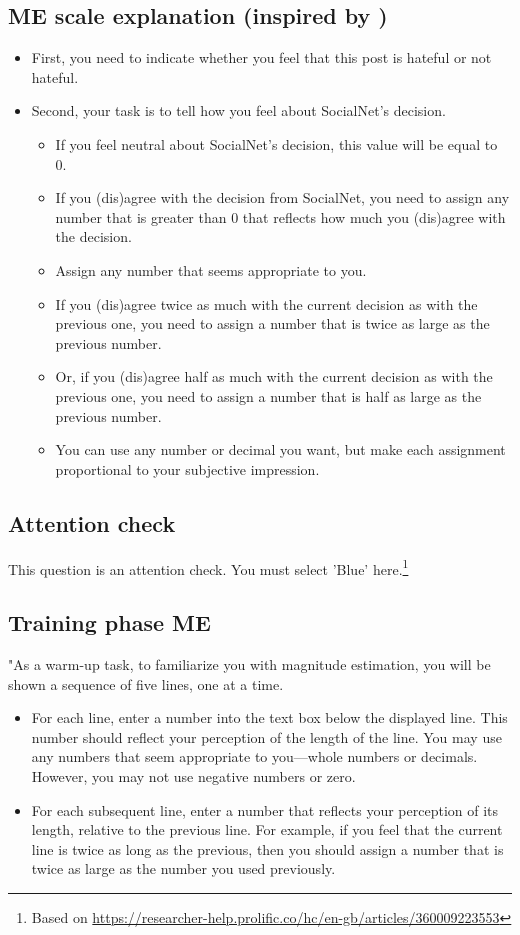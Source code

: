 \documentclass[a4paper]{article}
\begin{document}
\subsection{ME scale explanation (inspired by \cite{moskowitz1977magnitude})}
\begin{itemize}
    \item First, you need to indicate whether you feel that this post is hateful or not hateful.
    \item Second, your task is to tell how you feel about SocialNet's decision.
          \begin{itemize}
              \item If you feel neutral about SocialNet's decision, this value will be equal to 0.
              \item If you (dis)agree with the decision from SocialNet, you need to assign any number that is greater than 0 that reflects how much you (dis)agree with the decision.
              \item Assign any number that seems appropriate to you.
              \item If you (dis)agree twice as much with the current decision as with the previous one, you need to assign a number that is twice as large as the previous number.
              \item Or, if you (dis)agree half as much with the current decision as with the previous one, you need to assign a number that is half as large as the previous number.
              \item You can use any number or decimal you want, but make each assignment proportional to your subjective impression.
          \end{itemize}
\end{itemize}

\subsection{Attention check}
This question is an attention check. You must select 'Blue' here.\footnote{Based on \url{https://researcher-help.prolific.co/hc/en-gb/articles/360009223553}}

\subsection{Training phase ME}
"As a warm-up task, to familiarize you with magnitude estimation, you will be shown a sequence of five lines, one at a time.
\begin{itemize}
    \item For each line, enter a number into the text box below the displayed line. This number should reflect your perception of the length of the line. You may use any numbers that seem appropriate to you—whole numbers or decimals. However, you may not use negative numbers or zero.
    \item For each subsequent line, enter a number that reflects your perception of its length, relative to the previous line. For example, if you feel that the current line is twice as long as the previous, then you should assign a number that is twice as large as the number you used previously.
\end{itemize}
\end{document}
